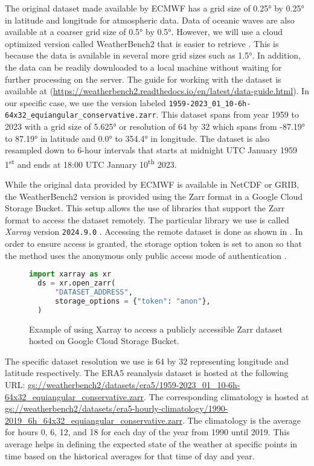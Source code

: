 The original dataset made available by ECMWF has a grid size of \ang{0.25} by \ang{0.25} in latitude and longitude for atmospheric data. Data of oceanic waves are also available at a coarser grid size of \ang{0.5} by \ang{0.5}. However, we will use a cloud optimized version called WeatherBench2 that is easier to retrieve \autocite{raspWeatherBench2Benchmark2023}. This is because the data is available in several more grid sizes such as \ang{1.5}. In addition, the data can be readily downloaded to a local machine without waiting for further processing on the server. The guide for working with the dataset is available at (\url{https://weatherbench2.readthedocs.io/en/latest/data-guide.html}). In our specific case, we use the version labeled \verb|1959-2023_01_10-6h-64x32_equiangular_conservative.zarr|. This dataset spans from year 1959 to 2023 with a grid size of \ang{5.625} or resolution of 64 by 32 which spans from \ang{-87.19} to \ang{87.19} in latitude and \ang{0.0} to \ang{354.4} in longitude. The dataset is also resampled down to 6-hour intervals that starts at midnight UTC January 1959 1\textsuperscript{st} and ends at 18:00 UTC January 10\textsuperscript{th} 2023.

While the original data provided by ECMWF is available in NetCDF or GRIB, the WeatherBench2 version is provided using the Zarr format in a Google Cloud Storage Bucket. This setup allows the use of libraries that support the Zarr format to access the dataset remotely. The particular library we use is called \emph{Xarray} version \verb|2024.9.0| \autocite{hoyer2017xarray,hoyerXarray2024}. Accessing the remote dataset is done as shown in . In order to ensure access is granted, the storage option token is set to anon so that the method uses the anonymous only public access mode of authentication \autocite{GCSFSGCSFs2023122post1+1g8e500c6dirty}.

\begin{figure}[H]
  \centering
  \begin{lstlisting}[language=Python]
  import xarray as xr
  ds = xr.open_zarr(
      "DATASET_ADDRESS",
      storage_options = {"token": "anon"},
  )
  \end{lstlisting}
  \caption{Example of using Xarray to access a publicly accessible Zarr dataset hosted on Google Cloud Storage Bucket.}\label{fig:access_remote_zarr}
\end{figure}

The specific dataset resolution we use is 64 by 32 representing longitude and latitude respectively. The ERA5 reanalysis dataset is hosted at the following URL\@: \url{gs://weatherbench2/datasets/era5/1959-2023_01_10-6h-64x32_equiangular_conservative.zarr}. The corresponding climatology is hosted at \url{gs://weatherbench2/datasets/era5-hourly-climatology/1990-2019_6h_64x32_equiangular_conservative.zarr}. The climatology is the average for hours 0, 6, 12, and 18 for each day of the year from 1990 until 2019. This average helps in defining the expected state of the weather at specific points in time based on the historical averages for that time of day and year.

